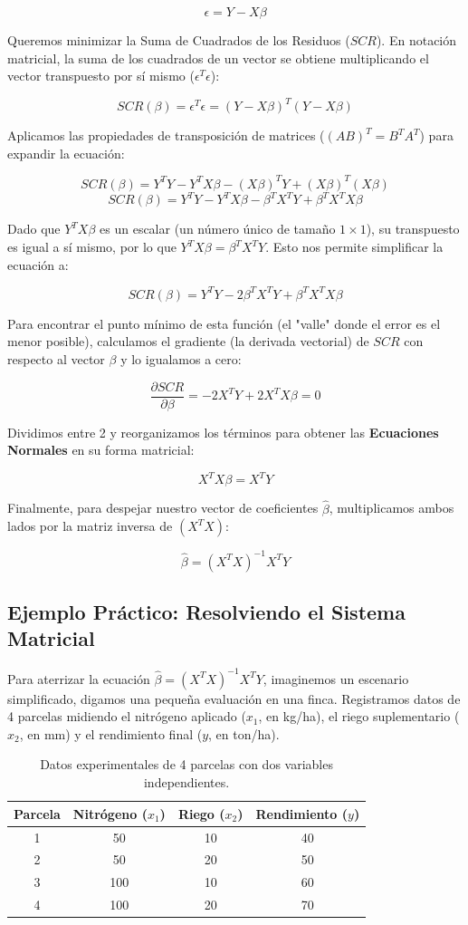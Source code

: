 \documentclass{article}
\begin{document}
$$ \epsilon = Y - X\beta $$

Queremos minimizar la Suma de Cuadrados de los Residuos ($SCR$). En notación matricial, la suma de los cuadrados de un vector se obtiene multiplicando el vector transpuesto por sí mismo ($\epsilon^T \epsilon$):

$$ SCR(\beta) = \epsilon^T \epsilon = (Y - X\beta)^T (Y - X\beta) $$

Aplicamos las propiedades de transposición de matrices ($(AB)^T = B^T A^T$) para expandir la ecuación:

$$ SCR(\beta) = Y^T Y - Y^T X\beta - (X\beta)^T Y + (X\beta)^T (X\beta) $$
$$ SCR(\beta) = Y^T Y - Y^T X\beta - \beta^T X^T Y + \beta^T X^T X\beta $$

Dado que $Y^T X\beta$ es un escalar (un número único de tamaño $1 \times 1$), su transpuesto es igual a sí mismo, por lo que $Y^T X\beta = \beta^T X^T Y$. Esto nos permite simplificar la ecuación a:

$$ SCR(\beta) = Y^T Y - 2\beta^T X^T Y + \beta^T X^T X\beta $$

Para encontrar el punto mínimo de esta función (el "valle" donde el error es el menor posible), calculamos el gradiente (la derivada vectorial) de $SCR$ con respecto al vector $\beta$ y lo igualamos a cero:

$$ \frac{\partial SCR}{\partial \beta} = -2X^T Y + 2X^T X\beta = 0 $$

Dividimos entre 2 y reorganizamos los términos para obtener las \textbf{Ecuaciones Normales} en su forma matricial:

$$ X^T X\beta = X^T Y $$

Finalmente, para despejar nuestro vector de coeficientes $\hat{\beta}$, multiplicamos ambos lados por la matriz inversa de $(X^T X)$:

$$ \hat{\beta} = (X^T X)^{-1} X^T Y $$

\subsection{Ejemplo Práctico: Resolviendo el Sistema Matricial}

Para aterrizar la ecuación $\hat{\beta} = (X^T X)^{-1} X^T Y$, imaginemos un escenario simplificado, digamos una pequeña evaluación en una finca. Registramos datos de 4 parcelas midiendo el nitrógeno aplicado ($x_1$, en kg/ha), el riego suplementario ($x_2$, en mm) y el rendimiento final ($y$, en ton/ha).

\begin{table}[h]
\centering
\begin{tabular}{|c|c|c|c|}
\hline
\textbf{Parcela} & \textbf{Nitrógeno ($x_1$)} & \textbf{Riego ($x_2$)} & \textbf{Rendimiento ($y$)} \\
\hline
1 & 50  & 10 & 40 \\
2 & 50  & 20 & 50 \\
3 & 100 & 10 & 60 \\
4 & 100 & 20 & 70 \\
\hline
\end{tabular}
\caption{Datos experimentales de 4 parcelas con dos variables independientes.}
\end{table}
\end{document}
